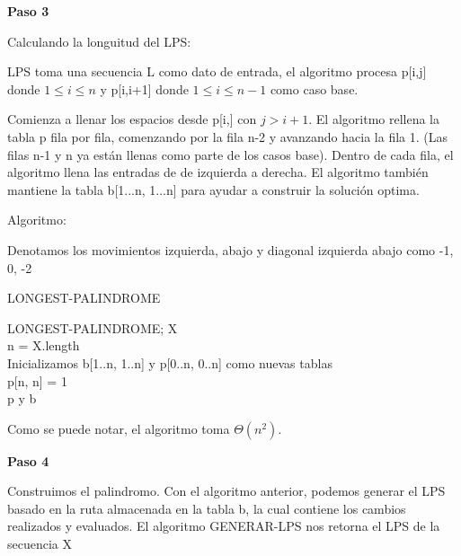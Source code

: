 \documentclass{article}
\begin{document}
\textbf{Paso 3}

Calculando la longuitud del LPS:

LPS toma una secuencia L como dato de entrada, el algoritmo procesa p[i,j] donde $1 \leq i \leq n$ y p[i,i+1] donde $1 \leq i \leq n-1$ como caso base.

Comienza a llenar los espacios desde p[i,] con $j>i+1$. El algoritmo rellena la tabla p fila por fila, comenzando por la fila n-2 y avanzando hacia la fila 1. (Las filas n-1 y n ya están llenas como parte de los casos base). Dentro de cada fila, el algoritmo llena las entradas de de izquierda a derecha. El algoritmo también mantiene la tabla b[1...n, 1...n] para ayudar a construir la solución optima. 

Algoritmo:

Denotamos los movimientos izquierda, abajo y diagonal izquierda abajo como -1, 0, -2

 \begin{algorithm}[H]
   \caption{LONGEST-PALINDROME}
   LONGEST-PALINDROME; X\\
   n = X.length\\
   Inicializamos b[1..n, 1..n] y p[0..n, 0..n] como nuevas tablas\\
   p[n, n] = 1\\
   \Return  p y b
  \end{algorithm} 
  
  Como se puede notar, el algoritmo toma $\Theta (n^2)$.

\textbf{Paso 4}

Construimos el palindromo. Con el algoritmo anterior, podemos generar el LPS basado en la ruta almacenada en la tabla b, la cual contiene los cambios realizados y evaluados. El algoritmo GENERAR-LPS nos retorna el LPS de la secuencia X
\end{document}

